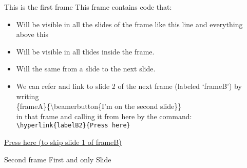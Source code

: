 \documentclass{beamer}
\begin{document}
\begin{frame}[label=frameA]{This is the first frame}
    This frame contains code that:

    \begin{itemize}
        \item Will be visible in all the slides of the frame like this line and everything above this
        \item Will be visible in all tlides inside the frame.
        \item Will the same from a slide to the next slide.
        \item We can refer and link to slide 2 of the next frame (labeled `frameB') by writing\\ \{frameA\}\{\textbackslash beamerbutton\{I'm on the second slide\}\}\\in that frame and calling it from here by the command:\\
        \texttt{\textbackslash hyperlink\{labelB2\}\{Press here\}}
    \end{itemize}
    \hyperlink{labelB}{Press here (to skip slide 1 of frameB)}
\end{frame}

\begin{frame}[label=frameB]{Second frame}
    First and only Slide\par
    \hypertarget{labelB}{}
\end{frame}
\end{document}
